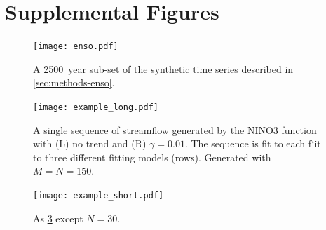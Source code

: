 \documentclass[11pt]{article}
\begin{document}
\section{Supplemental Figures}

\begin{figure}
  \texttt{[image: enso.pdf]}
  \caption{
    A \SI{2500}{year} sub-set of the synthetic time series described in \cref{sec:methods-enso}.\label{fig:enso-ts}
  }
\end{figure}

\begin{figure}
  \texttt{[image: example\_long.pdf]}
  \caption{
    A single sequence of streamflow generated by the NINO3 function with (L) no trend and (R) \(\gamma=0.01\). 
    The sequence is fit to each f`it to three different fitting models (rows). 
    Generated with \(M=N=150\).\label{fig:example-long}
  }
\end{figure}

\begin{figure}
  \texttt{[image: example\_short.pdf]}
  \caption{
    As \cref{fig:example-short} except \(N=30\).\label{fig:example-short}
  }
\end{figure}
\end{document}
